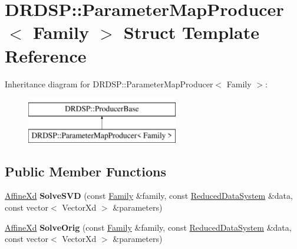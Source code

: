 \hypertarget{struct_d_r_d_s_p_1_1_parameter_map_producer}{\section{D\-R\-D\-S\-P\-:\-:Parameter\-Map\-Producer$<$ Family $>$ Struct Template Reference}
\label{struct_d_r_d_s_p_1_1_parameter_map_producer}
}
Inheritance diagram for D\-R\-D\-S\-P\-:\-:Parameter\-Map\-Producer$<$ Family $>$\-:\begin{figure}[H]
\begin{center}
\leavevmode
\includegraphics[height=2.000000cm]{struct_d_r_d_s_p_1_1_parameter_map_producer}
\end{center}
\end{figure}
\subsection*{Public Member Functions}
\begin{DoxyCompactItemize}
\item 
\hypertarget{struct_d_r_d_s_p_1_1_parameter_map_producer_a65c2df5b79df0c72c5e2728a5ac5555f}{\hyperlink{struct_d_r_d_s_p_1_1_affine}{Affine\-Xd} {\bfseries Solve\-S\-V\-D} (const \hyperlink{struct_d_r_d_s_p_1_1_family}{Family} \&family, const \hyperlink{struct_d_r_d_s_p_1_1_reduced_data_system}{Reduced\-Data\-System} \&data, const vector$<$ Vector\-Xd $>$ \&parameters)}\label{struct_d_r_d_s_p_1_1_parameter_map_producer_a65c2df5b79df0c72c5e2728a5ac5555f}

\item 
\hypertarget{struct_d_r_d_s_p_1_1_parameter_map_producer_a56b259d4543cf20255e03ce98717fc2c}{\hyperlink{struct_d_r_d_s_p_1_1_affine}{Affine\-Xd} {\bfseries Solve\-Orig} (const \hyperlink{struct_d_r_d_s_p_1_1_family}{Family} \&family, const \hyperlink{struct_d_r_d_s_p_1_1_reduced_data_system}{Reduced\-Data\-System} \&data, const vector$<$ Vector\-Xd $>$ \&parameters)}\label{struct_d_r_d_s_p_1_1_parameter_map_producer_a56b259d4543cf20255e03ce98717fc2c}

\end{DoxyCompactItemize}
